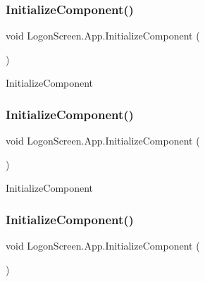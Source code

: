 \subsubsection{\texorpdfstring{Initialize\+Component()}{InitializeComponent()}\hspace{0.1cm}{\footnotesize\ttfamily [1/4]}}
{\footnotesize\ttfamily void Logon\+Screen.\+App.\+Initialize\+Component (\begin{DoxyParamCaption}{ }\end{DoxyParamCaption})}



Initialize\+Component 

\mbox{\label{class_logon_screen_1_1_app_a928f2912daa0652adcdfe26e81beecdc}} 
\subsubsection{\texorpdfstring{Initialize\+Component()}{InitializeComponent()}\hspace{0.1cm}{\footnotesize\ttfamily [2/4]}}
{\footnotesize\ttfamily void Logon\+Screen.\+App.\+Initialize\+Component (\begin{DoxyParamCaption}{ }\end{DoxyParamCaption})}



Initialize\+Component 

\mbox{\label{class_logon_screen_1_1_app_a928f2912daa0652adcdfe26e81beecdc}} 
\subsubsection{\texorpdfstring{Initialize\+Component()}{InitializeComponent()}\hspace{0.1cm}{\footnotesize\ttfamily [3/4]}}
{\footnotesize\ttfamily void Logon\+Screen.\+App.\+Initialize\+Component (\begin{DoxyParamCaption}{ }\end{DoxyParamCaption})}



